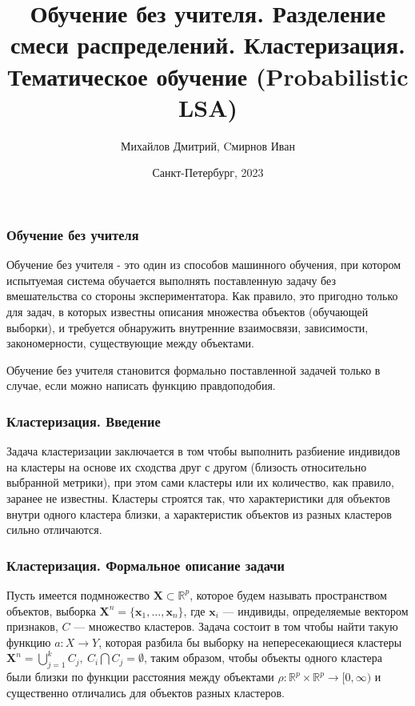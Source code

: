 \documentclass[ucs, notheorems, handout]{beamer}
\title[Обучение без учителя. Разделение смеси распределений. Кластеризация. Тематическое обучение (Probabilistic LSA)]{%
	    Обучение без учителя. Разделение смеси распределений. Кластеризация. Тематическое обучение (Probabilistic LSA)}
\author[Михайлов Дмитрий, Cмирнов Иван]{Михайлов Дмитрий, Cмирнов Иван}
\institute[Санкт-Петербургский Государственный Университет]{%
	    \small
	    Санкт-Петербургский государственный университет\\
	    Кафедра статистического моделирования\\
	    \vspace{1.25cm}
	}
\date[]{Санкт-Петербург, 2023}
\begin{document}
	
	\begin{frame}[plain]
		\titlepage
	\end{frame}
	
	
	\begin{frame}
	\frametitle{Обучение без учителя}
		Обучение без учителя - это один из способов машинного обучения, при котором испытуемая система обучается выполнять поставленную задачу без вмешательства со стороны экспериментатора.  Как правило, это пригодно только для задач, в которых известны описания множества объектов (обучающей выборки), и требуется обнаружить внутренние взаимосвязи, зависимости, закономерности, существующие между объектами.
	
		Обучение без учителя становится формально поставленной задачей только в случае, если можно написать функцию правдоподобия.
		\vspace{0.5cm}  
	\end{frame}
	
	\begin{frame}
	\frametitle{Кластеризация. Введение}
		Задача кластеризации заключается в том чтобы выполнить разбиение индивидов на кластеры на основе их сходства друг с другом (близость относительно выбранной метрики), при этом сами кластеры или их количество, как правило, заранее не известны. Кластеры строятся так, что характеристики для объектов внутри одного кластера близки, а характеристик объектов из разных кластеров сильно отличаются.
		\vspace{0.5cm}  
	\end{frame}
	
	\begin{frame}
	\frametitle{Кластеризация. Формальное описание задачи}
		Пусть имеется подмножество $\pmb X \subset \mathbb{R}^{p}$, которое будем называть
пространством объектов, выборка $\pmb X^{n} = \{\pmb x_1, \dots, \pmb x_{n}\}$, где $\pmb x_{i} $ --- индивиды, определяемые вектором признаков, $C$ --- множество кластеров. Задача состоит в том чтобы найти такую функцию $a: X \rightarrow Y$, которая разбила бы выборку на непересекающиеся кластеры $\pmb X^{n}= \bigcup_{j = 1}^{k} C_{j}, \  C_{i} \bigcap C_{j} = \emptyset$, таким образом, чтобы объекты одного кластера были близки по функции расстояния между объектами $\rho :  \mathbb{R}^{p} \times  \mathbb{R}^{p} \rightarrow [0,\infty)$ и существенно отличались для объектов разных кластеров.
		\vspace{0.5cm}  
	\end{frame}
	
\end{document}

